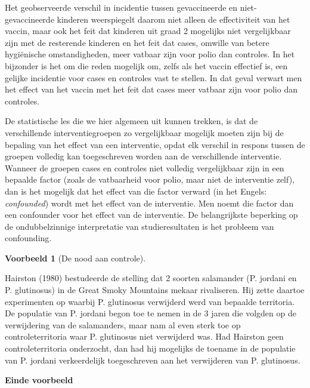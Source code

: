 \documentclass[
  12pt,dutch,coursenotes]{book}
\theoremstyle{definition}
\theoremstyle{definition}
\newtheorem{example}{Voorbeeld}[chapter]
\theoremstyle{definition}
\theoremstyle{definition}
\theoremstyle{remark}
\begin{document}
Het geobserveerde verschil in incidentie tussen gevaccineerde en
niet-gevaccineerde kinderen weerspiegelt daarom niet alleen de effectiviteit
van het vaccin, maar ook het feit dat kinderen uit graad 2 mogelijks niet
vergelijkbaar zijn met de resterende kinderen en het feit dat cases, omwille
van betere hygiënische omstandigheden, meer vatbaar zijn voor polio dan
controles. In het bijzonder is het om die reden mogelijk om, zelfs als het
vaccin effectief is, een gelijke incidentie voor cases en controles vast te
stellen. In dat geval verwart men het effect van het vaccin met het feit dat
cases meer vatbaar zijn voor polio dan controles.

De statistische les die we hier algemeen uit kunnen trekken, is dat de
verschillende interventiegroepen zo vergelijkbaar mogelijk moeten zijn bij
de bepaling van het effect van een interventie, opdat elk verschil in respons tussen
de groepen volledig kan toegeschreven worden aan de verschillende
interventie. Wanneer de groepen cases en controles niet volledig
vergelijkbaar zijn in een bepaalde factor (zoals de vatbaarheid voor polio,
maar niet de interventie zelf), dan is het mogelijk dat het effect van die
factor verward (in het Engels: \emph{confounded}) wordt met het effect van
de interventie. Men noemt die factor dan een confounder voor het effect van
de interventie. De belangrijkste beperking op de ondubbelzinnige interpretatie van studieresultaten is het probleem van confounding.

\begin{example}[De nood aan controle]
\protect\hypertarget{exm:unnamed-chunk-66}{}{\label{exm:unnamed-chunk-66} {} }
\end{example}
Hairston (1980) bestudeerde de stelling dat 2 soorten salamander (P. jordani en P. glutinosus) in de Great Smoky Mountains mekaar rivaliseren. Hij zette daartoe experimenten op waarbij P. glutinosus verwijderd werd van bepaalde territoria. De populatie van P. jordani begon toe te nemen in de 3 jaren die volgden op de verwijdering van de salamanders, maar nam al even sterk toe op controleterritoria waar P. glutinosus niet verwijderd was. Had Hairston geen controleterritoria onderzocht, dan had hij mogelijks de toename in de populatie van P. jordani verkeerdelijk toegeschreven aan het verwijderen van P. glutinosus.

\textbf{Einde voorbeeld}
\end{document}
